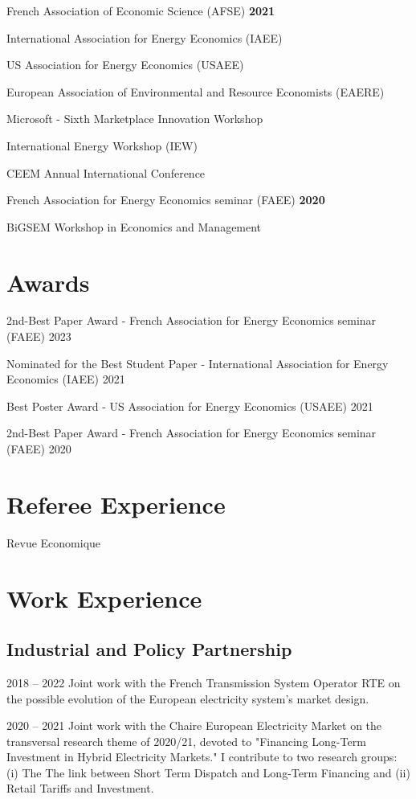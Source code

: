 \documentclass[letterpaper]{article}
\renewenvironment{itemize}{
  \begin{list}{}{
    \setlength{\leftmargin}{1.5em}
  }
}{
  \end{list}
}
\begin{document}
French Association of Economic Science (AFSE) \hfill \hfill \textbf{2021}

International Association for Energy Economics (IAEE) 

US Association for Energy Economics (USAEE)

European Association of Environmental and Resource Economists (EAERE)

Microsoft - Sixth Marketplace Innovation Workshop

International Energy Workshop (IEW)

CEEM Annual International Conference

\vspace{0.5cm}

French Association for Energy Economics seminar (FAEE)  \hfill \hfill \textbf{2020}

BiGSEM Workshop in Economics and Management


\section*{\textbf{Awards}}

2nd-Best Paper Award - French Association for Energy Economics seminar (FAEE) \hfill \hfill 2023

Nominated for the Best Student Paper - International Association for Energy Economics (IAEE) \hfill \hfill 2021

Best Poster Award - US Association for Energy Economics (USAEE) \hfill \hfill 2021

2nd-Best Paper Award - French Association for Energy Economics seminar (FAEE) \hfill \hfill 2020


\section*{\textbf{Referee Experience}} Revue Economique

\section*{\textbf{Work Experience}}

\subsection*{Industrial and Policy Partnership}

\begin{itemize}
    \item 2018 – 2022 Joint work with the French Transmission System Operator
RTE on the possible evolution of the European electricity system's market design.

\item 2020 – 2021 Joint work with the Chaire European Electricity Market on the transversal research theme of 2020/21, devoted to "Financing Long-Term Investment in Hybrid Electricity Markets." I contribute to two research groups: (i) The
The link between Short Term Dispatch and Long-Term Financing and
(ii) Retail Tariffs and Investment.
\end{itemize}
\end{document}

